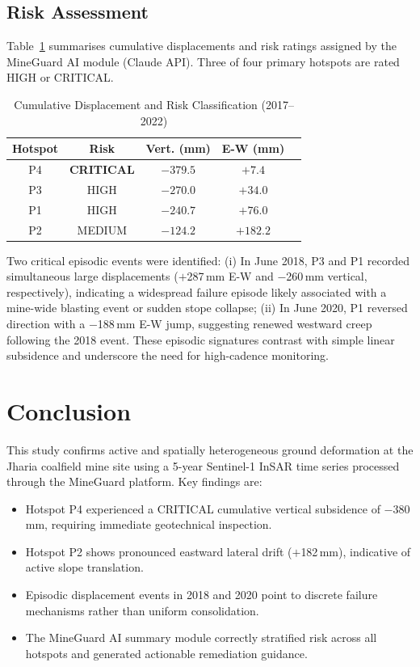 \documentclass[conference]{IEEEtran}
\begin{document}
\subsection{Risk Assessment}
Table~\ref{tab:risk} summarises cumulative displacements and risk ratings
assigned by the MineGuard AI module (Claude API).
Three of four primary hotspots are rated HIGH or CRITICAL.

\begin{table}[h]
\caption{Cumulative Displacement and Risk Classification (2017--2022)}
\label{tab:risk}
\centering
\small
\begin{tabular}{ccccc}
\toprule
\textbf{Hotspot} & \textbf{Risk} & \textbf{Vert. (mm)} & \textbf{E-W (mm)} \\
\midrule
P4 & \textbf{CRITICAL} & $-379.5$ & $+7.4$  \\
P3 & HIGH              & $-270.0$ & $+34.0$ \\
P1 & HIGH              & $-240.7$ & $+76.0$ \\
P2 & MEDIUM            & $-124.2$ & $+182.2$\\
\bottomrule
\end{tabular}
\end{table}

Two critical episodic events were identified:
(i) In June 2018, P3 and P1 recorded simultaneous large displacements
($+$287\,mm E-W and $-$260\,mm vertical, respectively), indicating a
widespread failure episode likely associated with a mine-wide blasting event
or sudden stope collapse;
(ii) In June 2020, P1 reversed direction with a $-$188\,mm E-W jump,
suggesting renewed westward creep following the 2018 event.
These episodic signatures contrast with simple linear subsidence and
underscore the need for high-cadence monitoring.

\section{Conclusion}
This study confirms active and spatially heterogeneous ground deformation at
the Jharia coalfield mine site using a 5-year Sentinel-1 InSAR time series
processed through the MineGuard platform. Key findings are:

\begin{itemize}
  \item Hotspot P4 experienced a CRITICAL cumulative vertical subsidence of
        $-$380\,mm, requiring immediate geotechnical inspection.
  \item Hotspot P2 shows pronounced eastward lateral drift ($+$182\,mm),
        indicative of active slope translation.
  \item Episodic displacement events in 2018 and 2020 point to discrete
        failure mechanisms rather than uniform consolidation.
  \item The MineGuard AI summary module correctly stratified risk across all
        hotspots and generated actionable remediation guidance.
\end{itemize}
\end{document}
